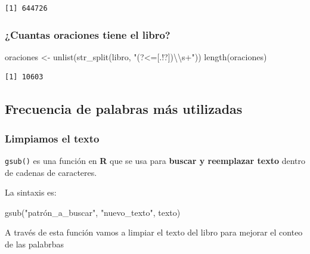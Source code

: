 \documentclass[
  letterpaper,
  DIV=11,
  numbers=noendperiod]{scrreprt}
\newenvironment{Shaded}{\begin{snugshade}}{\end{snugshade}}
\newcommand{\FunctionTok}[1]{\textcolor[rgb]{0.28,0.35,0.67}{#1}}
\newcommand{\NormalTok}[1]{\textcolor[rgb]{0.00,0.23,0.31}{#1}}
\newcommand{\OtherTok}[1]{\textcolor[rgb]{0.00,0.23,0.31}{#1}}
\newcommand{\SpecialCharTok}[1]{\textcolor[rgb]{0.37,0.37,0.37}{#1}}
\newcommand{\StringTok}[1]{\textcolor[rgb]{0.13,0.47,0.30}{#1}}
\begin{document}
\begin{verbatim}
[1] 644726
\end{verbatim}

\subsubsection{¿Cuantas oraciones tiene el
libro?}\label{cuantas-oraciones-tiene-el-libro}

\begin{Shaded}
\begin{Highlighting}[]
\NormalTok{oraciones }\OtherTok{\textless{}{-}} \FunctionTok{unlist}\NormalTok{(}\FunctionTok{str\_split}\NormalTok{(libro, }\StringTok{"(?\textless{}=[.!?])}\SpecialCharTok{\textbackslash{}\textbackslash{}}\StringTok{s+"}\NormalTok{))}
\FunctionTok{length}\NormalTok{(oraciones)}
\end{Highlighting}
\end{Shaded}

\begin{verbatim}
[1] 10603
\end{verbatim}

\subsection{Frecuencia de palabras más
utilizadas}\label{frecuencia-de-palabras-muxe1s-utilizadas}

\subsubsection{Limpiamos el texto}\label{limpiamos-el-texto}

\texttt{gsub()} es una función en \textbf{R} que se usa para
\textbf{buscar y reemplazar texto} dentro de cadenas de caracteres.

La sintaxis es:

\begin{Shaded}
\begin{Highlighting}[]
\FunctionTok{gsub}\NormalTok{(}\StringTok{"patrón\_a\_buscar"}\NormalTok{, }\StringTok{"nuevo\_texto"}\NormalTok{, texto)}
\end{Highlighting}
\end{Shaded}

A través de esta función vamos a limpiar el texto del libro para mejorar
el conteo de las palabrbas
\end{document}
